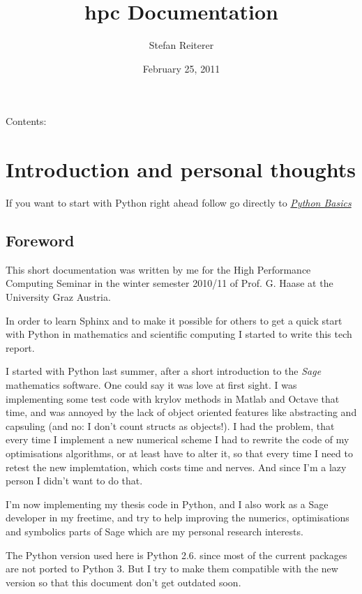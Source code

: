\documentclass[letterpaper,10pt,english]{manual}
\title{hpc Documentation}
\date{February 25, 2011}
\author{Stefan Reiterer}
\begin{document}
\maketitle
\tableofcontents
\hypertarget{--doc-index}{}


Contents:

\resetcurrentobjects
\hypertarget{--doc-Introduction}{}

\chapter{Introduction and personal thoughts}

If you want to start with Python right ahead  follow go directly to \hyperlink{basics-ref}{\emph{Python Basics}}


\section{Foreword}

This short documentation was written by me for the High Performance Computing Seminar
in the winter semester 2010/11 of Prof. G. Haase at the University Graz Austria.

In order to learn Sphinx and to make it possible for others to get a
quick start with Python in mathematics and scientific computing I started to write this tech report.

I started with Python last summer, after a short introduction to the \emph{Sage} mathematics software. One could
say it was love at first sight. I was implementing some test code with krylov methods in Matlab and Octave that
time, and was annoyed by the lack of object oriented features like
abstracting and capsuling (and no: I don't count structs as objects!). I had the problem, that
every time I implement a new numerical scheme I had to rewrite the code of my optimisations algorithms, or at least have
to alter it, so that every time I need to retest the new implemtation, which costs time and nerves. And since I'm a
lazy person I didn't want to do that.

I'm now implementing my thesis code in Python, and I also work as a Sage developer in my freetime, and try to help
improving the numerics, optimisations and symbolics parts of Sage which are my personal research interests.

The Python version used here is Python 2.6. since most of the current packages are not ported to Python 3.
But I try to make them compatible with the new version so that this document don't get outdated soon.
\end{document}
